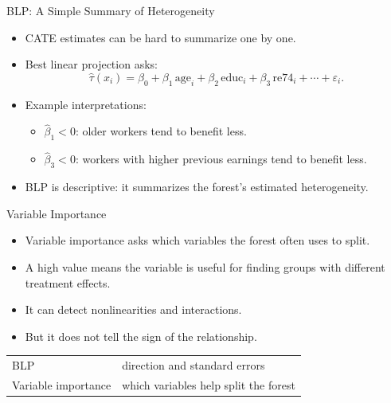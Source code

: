 \documentclass[hyperref={pdfpagelabels=false}]{beamer}
\begin{document}
\begin{frame}{BLP: A Simple Summary of Heterogeneity}
\begin{itemize}
  \item CATE estimates can be hard to summarize one by one.
  \vspace{0.2cm}
  \item Best linear projection asks:
  \[
    \hat{\tau}(x_i)
    =
    \beta_0+\beta_1\,\text{age}_i+\beta_2\,\text{educ}_i+\beta_3\,\text{re74}_i+\cdots+\varepsilon_i.
  \]
  \vspace{0.2cm}
  \item Example interpretations:
  \begin{itemize}
    \item $\hat{\beta}_1<0$: older workers tend to benefit less.
    \item $\hat{\beta}_3<0$: workers with higher previous earnings tend to benefit less.
  \end{itemize}
  \vspace{0.2cm}
  \item BLP is descriptive: it summarizes the forest's estimated heterogeneity.
\end{itemize}
\end{frame}

\begin{frame}{Variable Importance}
\begin{itemize}
  \item Variable importance asks which variables the forest often uses to split.
  \vspace{0.2cm}
  \item A high value means the variable is useful for finding groups with different treatment effects.
  \vspace{0.2cm}
  \item It can detect nonlinearities and interactions.
  \vspace{0.2cm}
  \item But it does not tell the sign of the relationship.
\end{itemize}

\vspace{0.3cm}
\begin{center}
\small
\begin{tabular}{ll}
\toprule
BLP & direction and standard errors \\
Variable importance & which variables help split the forest \\
\bottomrule
\end{tabular}
\end{center}
\end{frame}
\end{document}
